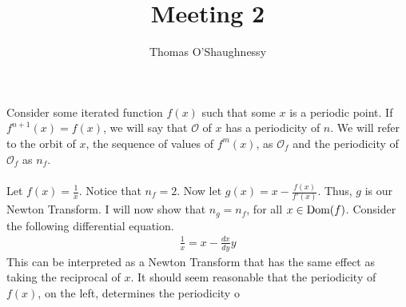 \documentclass[12pt]{article}
\author{Thomas O'Shaughnessy}
\title{Meeting 2}
\begin{document}
\maketitle

Consider some iterated function $f(x)$ such that some $x$ is a periodic point. If $f^{n+1}(x)=f(x)$,
we will say that $\mathcal{O}$ of $x$ has a periodicity of $n$. We will refer to the orbit of $x$,
the sequence of values of $f^m(x)$, as $\mathcal{O}_f$ and the periodicity of $\mathcal{O}_f$ as $n_f$.\\\\
Let $f(x) = \frac{1}{x}$. Notice that $n_f = 2$. Now let $g(x) = x - \frac{f(x)}{f'(x)}$. Thus, $g$ is
our Newton Transform. I will now show that $n_g = n_f$, for all $x\in\textup{Dom}(f)$. Consider the
following differential equation.
\begin{gather*}
				\frac{1}{x} = x - \frac{dx}{dy}y
\end{gather*}
This can be interpreted as a Newton Transform that has the same effect as taking the reciprocal
of $x$. It should seem reasonable that the periodicity of $f(x)$, on the left,
determines the periodicity o
\end{document}
